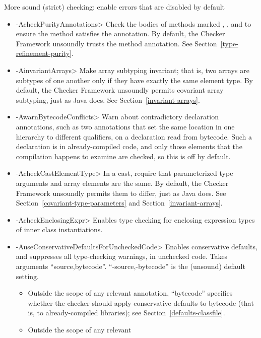 \label{unsound-by-default}
More sound (strict) checking: enable errors that are disabled by default
\begin{itemize}
\item \<-AcheckPurityAnnotations>
  Check the bodies of methods marked
  ,
  ,
  and 
  to ensure the method satisfies the annotation.  By default,
  the Checker Framework unsoundly trusts the method annotation.  See
  Section~\ref{type-refinement-purity}.
\item \<-AinvariantArrays>
  Make array subtyping invariant; that is, two arrays are subtypes of one
  another only if they have exactly the same element type.  By default,
  the Checker Framework unsoundly permits covariant array subtyping, just
  as Java does.  See Section~\ref{invariant-arrays}.
\item \<-AwarnBytecodeConflicts>
  Warn about contradictory declaration annotations, such as two
   annotations that set the same
  location in one hierarchy to different qualifiers, on a declaration read from
  bytecode.  Such a declaration is in already-compiled code, and only those
  elements that the compilation happens to examine are checked, so this is off
  by default.
\item \<-AcheckCastElementType>
  In a cast, require that parameterized type arguments and array elements
  are the same.  By default, the Checker Framework unsoundly permits them
  to differ, just as Java does.  See Section~\ref{covariant-type-parameters}
  and Section~\ref{invariant-arrays}.
\item \<-AcheckEnclosingExpr>
  Enables type checking for enclosing expression types of inner class instantiations.
\item \<-AuseConservativeDefaultsForUncheckedCode>
  Enables conservative defaults, and suppresses all type-checking warnings,
  in unchecked code.  Takes arguments ``source,bytecode''.
  ``-source,-bytecode'' is the (unsound) default setting.
  \begin{itemize}
  \item
  Outside the scope of any relevant
   annotation, ``bytecode'' specifies
  whether the checker should apply conservative defaults to
  bytecode (that is, to already-compiled libraries); see
  Section~\ref{defaults-classfile}.
  \item
  Outside the scope of any relevant

\end{itemize}
\end{itemize}
